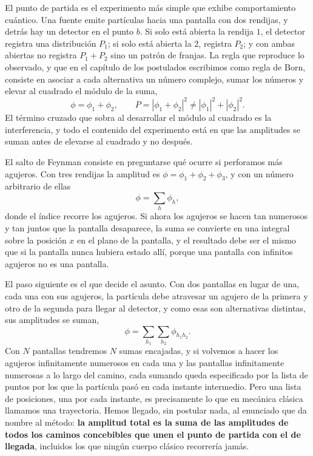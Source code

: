         El punto de partida es el experimento más simple que exhibe comportamiento cuántico. Una fuente emite partículas hacia una pantalla con dos rendijas, y detrás hay un detector en el punto $b$. Si solo está abierta la rendija $1$, el detector registra una distribución $P_{1}$; si solo está abierta la $2$, registra $P_{2}$; y con ambas abiertas no registra $P_{1}+P_{2}$ sino un patrón de franjas. La regla que reproduce lo observado, y que en el capítulo de los postulados escribimos como regla de Born, consiste en asociar a cada alternativa un número complejo, sumar los números y elevar al cuadrado el módulo de la suma,
        \begin{equation}\label{eq:DosRendijas}
            \phi = \phi_{1} + \phi_{2}, \qquad P = \left|\phi_{1}+\phi_{2}\right|^{2} \neq \left|\phi_{1}\right|^{2} + \left|\phi_{2}\right|^{2} .
        \end{equation}
        El término cruzado que sobra al desarrollar el módulo al cuadrado es la interferencia, y todo el contenido del experimento está en que las amplitudes se suman antes de elevarse al cuadrado y no después.

        El salto de Feynman consiste en preguntarse qué ocurre si perforamos más agujeros. Con tres rendijas la amplitud es $\phi = \phi_{1}+\phi_{2}+\phi_{3}$, y con un número arbitrario de ellas
        \begin{equation}\label{eq:MuchasRendijas}
            \phi = \sum_{h} \phi_{h},
        \end{equation}
        donde el índice recorre los agujeros. Si ahora los agujeros se hacen tan numerosos y tan juntos que la pantalla desaparece, la suma se convierte en una integral sobre la posición $x$ en el plano de la pantalla, y el resultado debe ser el mismo que si la pantalla nunca hubiera estado allí, porque una pantalla con infinitos agujeros no es una pantalla.

        El paso siguiente es el que decide el asunto. Con dos pantallas en lugar de una, cada una con sus agujeros, la partícula debe atravesar un agujero de la primera y otro de la segunda para llegar al detector, y como esas son alternativas distintas, sus amplitudes se suman,
        \begin{equation}\label{eq:DosPantallas}
            \phi = \sum_{h_{1}}\sum_{h_{2}} \phi_{h_{1}h_{2}} .
        \end{equation}
        Con $N$ pantallas tendremos $N$ sumas encajadas, y si volvemos a hacer los agujeros infinitamente numerosos en cada una y las pantallas infinitamente numerosas a lo largo del camino, cada sumando queda especificado por la lista de puntos por los que la partícula pasó en cada instante intermedio. Pero una lista de posiciones, una por cada instante, es precisamente lo que en mecánica clásica llamamos una trayectoria. Hemos llegado, sin postular nada, al enunciado que da nombre al método: \textbf{la amplitud total es la suma de las amplitudes de todos los caminos concebibles que unen el punto de partida con el de llegada}, incluidos los que ningún cuerpo clásico recorrería jamás.

